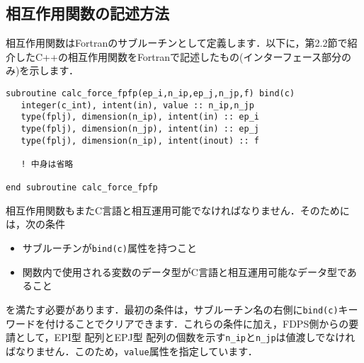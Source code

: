 \documentclass[twocolumn,10pt]{jarticle}
\begin{document}
\subsection{相互作用関数の記述方法}\label{subsec:how_to_def_interact_func}
相互作用関数はFortranのサブルーチンとして定義します．以下に，第2.2節で紹介したC++の相互作用関数をFortranで記述したもの(インターフェース部分のみ)を示します．
{\scriptsize
\begin{verbatim}
subroutine calc_force_fpfp(ep_i,n_ip,ep_j,n_jp,f) bind(c)
   integer(c_int), intent(in), value :: n_ip,n_jp
   type(fplj), dimension(n_ip), intent(in) :: ep_i
   type(fplj), dimension(n_jp), intent(in) :: ep_j
   type(fplj), dimension(n_ip), intent(inout) :: f
   
   ! 中身は省略
   
end subroutine calc_force_fpfp
\end{verbatim}
}\noindent
相互作用関数もまたC言語と相互運用可能でなければなりません．そのためには，次の条件
\begin{itemize}
\item サブルーチンが\texttt{bind(c)}属性を持つこと
\item 関数内で使用される変数のデータ型がC言語と相互運用可能なデータ型であること
\end{itemize}
を満たす必要があります．最初の条件は，サブルーチン名の右側に\texttt{bind(c)}キーワードを付けることでクリアできます．これらの条件に加え，FDPS側からの要請として，EPI型 配列とEPJ型 配列の個数を示す\texttt{n\_ip}と\texttt{n\_jp}は値渡しでなければなりません．このため，\texttt{value}属性を指定しています．
\end{document}

